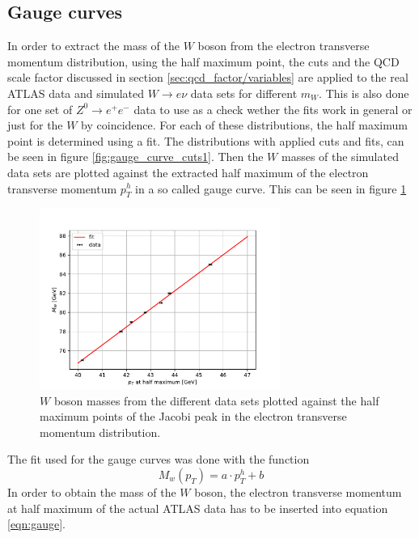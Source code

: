 \subsection{Gauge curves}
    \label{sec:gauge_curves}
    In order to extract the mass of the $W$ boson from the electron transverse momentum distribution, using the half maximum point, the cuts and the QCD scale factor 
    discussed in section \ref{sec:qcd_factor/variables} are applied to the real ATLAS data and simulated $W \rightarrow e\nu$ data sets for different $m_W$.
    This is also done for one set of $Z^0 \rightarrow e^+e^-$ data to use as a check wether the fits work in general or just for the $W$ by coincidence.   
    For each of these distributions, the half maximum point is determined using a fit. \cite{atlaslabmanual}
    The distributions with applied cuts and fits, can be seen in figure \ref{fig:gauge_curve_cuts1}.
    Then the $W$ masses of the simulated data sets are plotted against the extracted half maximum of the electron transverse momentum $p_T^h$ in a so called gauge curve.
    This can be seen in figure \ref{fig:gauge1}
    \begin{figure}
        \centering
        \includegraphics[width=0.7\textwidth]{../W_mass/gauge1.pdf}
        \caption{$W$ boson masses from the different data sets plotted against the half maximum points of the Jacobi peak in the electron transverse momentum distribution.}
        \label{fig:gauge1}
    \end{figure}
    The fit used for the gauge curves was done with the function
    \begin{equation}
        \label{eqn:gauge}
        M_w(p_T) = a \cdot p_T^h + b
    \end{equation}
    In order to obtain the mass of the $W$ boson, the electron transverse momentum at half maximum of the actual ATLAS data has to be inserted into equation \ref{eqn:gauge}.

